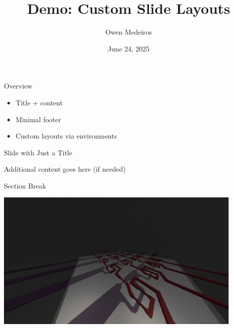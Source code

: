 \documentclass[aspectratio=169]{beamer}
\title{Demo: Custom Slide Layouts}
\author{Owen Medeiros}
\date{June 24, 2025}
\begin{document}
\begin{SlideTitleContent}{Overview}
  \begin{itemize}
    \item Title + content
    \item Minimal footer
    \item Custom layouts via environments
  \end{itemize}
\end{SlideTitleContent}

\begin{SlideTitleOnly}{Slide with Just a Title}
  \begin{center}
    \Large Additional content goes here (if needed)
  \end{center}
\end{SlideTitleOnly}

\begin{SlideTitleCentered}{Section Break}
\end{SlideTitleCentered}

\begin{SlideImageOnly}
  \includegraphics[width=0.9\textwidth]{example_image.png}  %
\end{SlideImageOnly}
\end{document}

